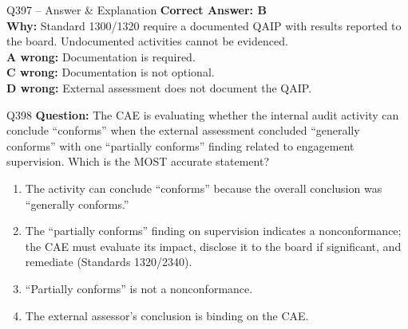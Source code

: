 \documentclass[aspectratio=169,10pt]{beamer}
\begin{document}
	\begin{frame}[t]{Q397 -- Answer \& Explanation}
		\small
		\textbf{Correct Answer: B} \\[4pt]
		\textbf{Why:} Standard 1300/1320 require a documented QAIP with results reported to the board. Undocumented activities cannot be evidenced. \\[4pt]
		\textbf{A wrong:} Documentation is required. \\[2pt]
		\textbf{C wrong:} Documentation is not optional. \\[2pt]
		\textbf{D wrong:} External assessment does not document the QAIP.
	\end{frame}
	
	\begin{frame}[t]{Q398}
		\small
		\textbf{Question:} The CAE is evaluating whether the internal audit activity can conclude ``conforms'' when the external assessment concluded ``generally conforms'' with one ``partially conforms'' finding related to engagement supervision. Which is the MOST accurate statement?
		\begin{enumerate}[label=\Alph*.,itemsep=1pt,topsep=2pt]
			\item The activity can conclude ``conforms'' because the overall conclusion was ``generally conforms.''
			\item The ``partially conforms'' finding on supervision indicates a nonconformance; the CAE must evaluate its impact, disclose it to the board if significant, and remediate (Standards 1320/2340).
			\item ``Partially conforms'' is not a nonconformance.
			\item The external assessor's conclusion is binding on the CAE.
		\end{enumerate}
	\end{frame}
	
\end{document}
